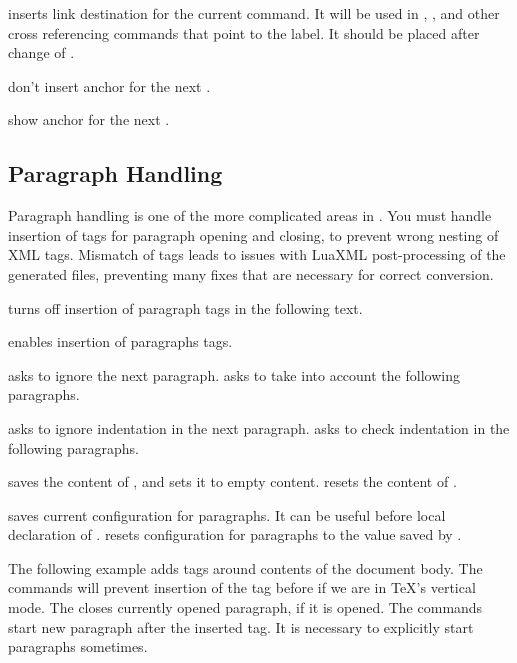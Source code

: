  inserts link destination for the current  command. It will be used 
in ,  , and other cross referencing commands that point to the label.
It should be placed after change of . 

 don't insert anchor for the next .

 show anchor for the next .

\subsection{Paragraph Handling}
\label{sec:paragraph_handling}

Paragraph handling is one of the more complicated areas in \texfourht.
You must handle insertion of tags for paragraph opening and closing,
to prevent wrong nesting of XML tags. Mismatch of tags leads to issues with 
LuaXML post-processing of the generated files, preventing many fixes 
that are necessary for correct conversion.

 turns off insertion of paragraph tags in the following text.

 enables insertion of paragraphs tags.

 asks to ignore the next paragraph.
 asks to take into account the following paragraphs.

  asks to ignore indentation in the next paragraph.
    asks to check indentation in the following paragraphs.

  saves the content of , and sets it to empty content.
 resets the content of .

 saves current configuration for paragraphs. It can be
useful before local declaration of .
 resets configuration for paragraphs to the value saved by
.


The following example adds  tags around contents of the document body.
The \texcommand{\ifvmode\IgnorePar\fi} commands will prevent insertion of the  tag 
before  if we are in \TeX's vertical mode. The \texcommand{\EndP} closes currently
opened paragraph, if it is opened. The \texcommand{\par\ShowPar} commands start new paragraph
after the inserted  tag. It is necessary to explicitly start paragraphs sometimes.

